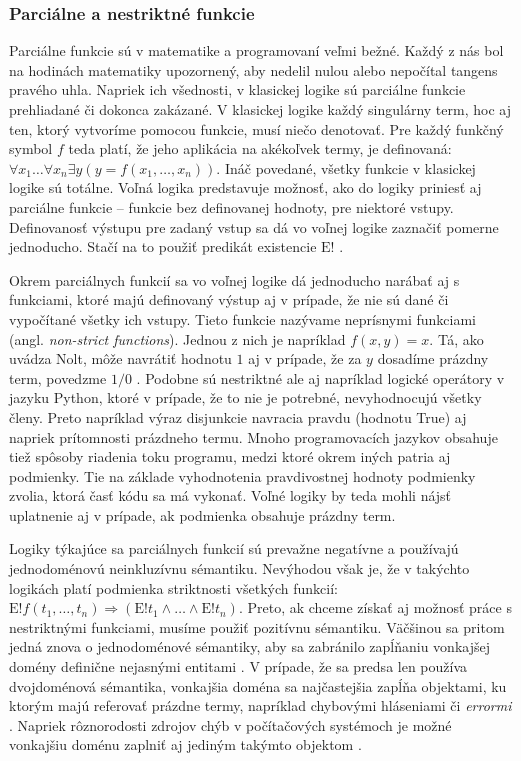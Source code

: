 \documentclass[12pt, letterpaper]{article}
\begin{document}
\subsubsection{Parciálne a nestriktné funkcie}
Parciálne funkcie sú v matematike a programovaní veľmi bežné. Každý z nás bol na hodinách matematiky upozornený, aby nedelil nulou alebo nepočítal tangens pravého uhla. Napriek ich všednosti, v klasickej logike sú parciálne funkcie prehliadané či dokonca zakázané. V klasickej logike každý singulárny term, hoc aj ten, ktorý vytvoríme pomocou funkcie, musí niečo denotovať. Pre každý funkčný symbol $f$ teda platí, že jeho aplikácia na akékoľvek termy, je definovaná: $\forall x_{1}\dots\forall x_{n} \exists y (y = f(x_{1},\dots,x_{n}))$. Ináč povedané, všetky funkcie v klasickej logike sú totálne. Voľná logika predstavuje možnosť, ako do logiky priniesť aj parciálne funkcie -- funkcie bez definovanej hodnoty, pre niektoré vstupy. Definovanosť výstupu pre zadaný vstup sa dá vo voľnej logike zaznačiť pomerne jednoducho. Stačí na to použiť predikát existencie $\text{E}!$ \parencites[]{sep-logic-free}.\par 
Okrem parciálnych funkcií sa vo voľnej logike dá jednoducho narábať aj s funkciami, ktoré majú definovaný výstup aj v prípade, že nie sú dané či vypočítané všetky ich vstupy. Tieto funkcie nazývame neprísnymi funkciami (angl. \textit{non-strict functions}). Jednou z nich je napríklad $f(x,y) = x$. Tá, ako uvádza Nolt, môže navrátiť hodnotu $1$ aj v prípade, že za $y$ dosadíme prázdny term, povedzme $1/0$ \parencites[]{sep-logic-free}. Podobne sú nestriktné ale aj napríklad logické operátory v jazyku Python, ktoré v prípade, že to nie je potrebné, nevyhodnocujú všetky členy. Preto napríklad výraz disjunkcie  navracia pravdu (hodnotu True) aj napriek prítomnosti prázdneho termu. Mnoho programovacích jazykov obsahuje tiež spôsoby riadenia toku programu, medzi ktoré okrem iných patria aj podmienky. Tie na základe vyhodnotenia pravdivostnej hodnoty podmienky zvolia, ktorá časť kódu sa má vykonať. Voľné logiky by teda mohli nájsť uplatnenie aj v prípade, ak podmienka obsahuje prázdny term.\par
Logiky týkajúce sa parciálnych funkcií sú prevažne negatívne a používajú jednodoménovú neinkluzívnu sémantiku. Nevýhodou však je, že v takýchto logikách platí podmienka striktnosti všetkých funkcií: $\text{E}!f(t_1,\dots,t_n) \Rightarrow (\text{E}!t_1 \land \dots \land \text{E}!t_n)$. Preto, ak chceme získať aj možnosť práce s nestriktnými funkciami, musíme použiť pozitívnu sémantiku. Väčšinou sa pritom jedná znova o jednodoménové sémantiky, aby sa zabránilo zapĺňaniu vonkajšej domény definične nejasnými entitami \parencites[159--160]{Gumb2001}[1046]{Nolt2007}[]{sep-logic-free}.  V prípade, že sa predsa len používa dvojdoménová sémantika, vonkajšia doména sa najčastejšia zapĺňa objektami, ku ktorým majú referovať prázdne termy, napríklad chybovými hláseniami či \textit{errormi} \parencites[1047]{Nolt2007}. Napriek rôznorodosti zdrojov chýb v počítačových systémoch je možné vonkajšiu doménu zaplniť aj jediným takýmto objektom \parencites[160--161]{Gumb2001}.\par
\end{document}

